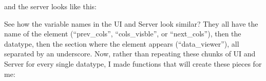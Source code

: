 \documentclass[]{article}
\newenvironment{Shaded}{\begin{snugshade}}{\end{snugshade}}
\newcommand{\KeywordTok}[1]{\textcolor[rgb]{0.13,0.29,0.53}{\textbf{#1}}}
\newcommand{\DecValTok}[1]{\textcolor[rgb]{0.00,0.00,0.81}{#1}}
\newcommand{\StringTok}[1]{\textcolor[rgb]{0.31,0.60,0.02}{#1}}
\newcommand{\CommentTok}[1]{\textcolor[rgb]{0.56,0.35,0.01}{\textit{#1}}}
\newcommand{\OperatorTok}[1]{\textcolor[rgb]{0.81,0.36,0.00}{\textbf{#1}}}
\newcommand{\NormalTok}[1]{#1}
\begin{document}
and the server looks like this:

\begin{Shaded}
\end{Shaded}

See how the variable names in the UI and Server look similar? They all
have the name of the element (``prev\_cols'', ``cols\_visble'', or
``next\_cols''), then the datatype, then the section where the element
appears (``data\_viewer''), all separated by an underscore. Now, rather
than repeating these chunks of UI and Server for every single datatype,
I made functions that will create these pieces for me:
\end{document}
